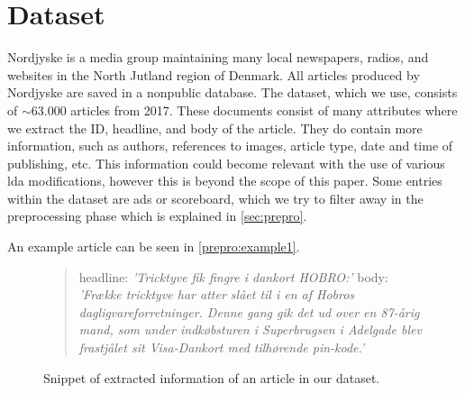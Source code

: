 \section{Dataset}\label{sec:dataset}
Nordjyske is a media group maintaining many local newspapers, radios, and websites in the North Jutland region of Denmark.
All articles produced by Nordjyske are saved in a nonpublic database.
The dataset, which we use, consists of $\sim\! 63.000$ articles from 2017.
These documents consist of many attributes where we extract the ID, headline, and body of the article.
They do contain more information, such as authors, references to images, article type, date and time of publishing, etc.
This information could become relevant with the use of various \gls{lda} modifications, however this is beyond the scope of this paper.
Some entries within the dataset are ads or scoreboard, which we try to filter away in the preprocessing phase which is explained in \autoref{sec:prepro}.

An example article can be seen in \autoref{prepro:example1}.

\begin{figure}[h]
	\begin{framed}
		\begin{quote}
			headline: \textit{'Tricktyve fik fingre i dankort HOBRO:'}
			body: \textit{'Frække tricktyve har atter slået til i en af Hobros dagligvareforretninger. Denne gang gik det ud over en 87-årig mand, som under indkøbsturen i Superbrugsen i Adelgade blev frastjålet sit Visa-Dankort med tilhørende pin-kode.'}
		\end{quote}
	\end{framed}
		\caption{Snippet of extracted information of an article in our dataset.}
		\label{prepro:example1}
\end{figure}
